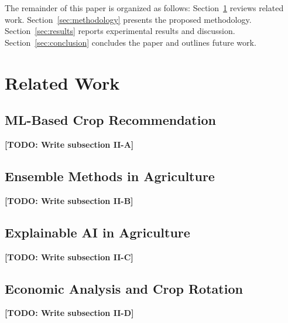 \documentclass[conference]{IEEEtran}
\begin{document}
The remainder of this paper is organized as follows: Section~\ref{sec:related} reviews related work. Section~\ref{sec:methodology} presents the proposed methodology. Section~\ref{sec:results} reports experimental results and discussion. Section~\ref{sec:conclusion} concludes the paper and outlines future work.

\section{Related Work}
\label{sec:related}

\subsection{ML-Based Crop Recommendation}
\textbf{[TODO: Write subsection II-A]}

\subsection{Ensemble Methods in Agriculture}
\textbf{[TODO: Write subsection II-B]}

\subsection{Explainable AI in Agriculture}
\textbf{[TODO: Write subsection II-C]}

\subsection{Economic Analysis and Crop Rotation}
\textbf{[TODO: Write subsection II-D]}
\end{document}
